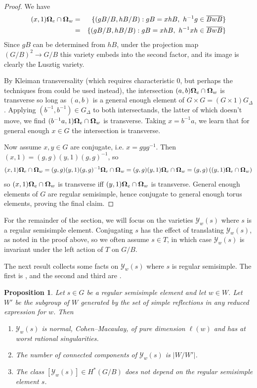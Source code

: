\documentclass[11pt]{amsart}
\newtheorem{proposition}[Thm]{Proposition}
\theoremstyle{definition}
\newcommand\bOm{{\bf \Omega}}
\newcommand\calY{{\mathcal Y}}
\begin{document}
\begin{proof}
  We have 
  \begin{eqnarray*}
    (x, 1) \bOm_e \cap \bOm_w
    &=& \{(gB/B, hB/B): gB = xhB,\ h^{-1}g \in \overline{BwB} \}  \\
    &=& \{(gB/B, hB/B): gB = xhB,\ h^{-1}xh \in \overline{BwB} \}  
  \end{eqnarray*}
  Since $gB$ can be determined from $hB$, under the projection map
  $(G/B)^2\to G/B$ this variety embeds into the second factor, and its
  image is clearly the Lusztig variety.

  By Kleiman transversality (which requires characteristic $0$,
  but perhaps the techniques from \cite{SchubertInduction} could be
  used instead), the
  intersection $(a,b)\bOm_e \cap \bOm_w$ is transverse so long as
  $(a,b)$ is a general enough element of $G\times G = (G\times 1)G_\Delta$.
  Applying $(b^{-1},b^{-1})\in G_\Delta$ to both intersectands, the latter
  of which doesn't move, we find $(b^{-1}a,1)\bOm_e \cap \bOm_w$ is transverse.
  Taking $x = b^{-1}a$, we learn that for general enough $x\in G$
  the intersection is transverse.

  Now assume $x,y \in G$ are conjugate, i.e. $x = g y g^{-1}$.
  Then $(x,1) = (g,g)(y,1)(g,g)^{-1}$, so
  \[ (x,1)\bOm_e \cap \bOm_w
  = (g,g)(y,1)(g,g)^{-1}\bOm_e \cap \bOm_w
  = (g,g)(y,1)\bOm_e \cap \bOm_w
  = (g,g)\left( (y,1)\bOm_e \cap \bOm_w\right)
  \]
  so $(x,1)\bOm_e \cap \bOm_w$ is transverse iff
  $(y,1)\bOm_e \cap \bOm_w$ is transverse. General enough elements of
  $G$ are regular semisimple, hence conjugate to general enough torus elements,
  proving the final claim.
\end{proof}

For the remainder of the section, we will focus on the varieties
$\calY_w(s)$ where $s$ is a regular semisimple element. 
Conjugating $s$ has the effect of translating $\calY_w(s)$, as noted
in the proof above, so we often assume $s \in T$, in which case $\calY_w(s)$ is invariant under the left action of $T$ on $G/B$.


The next result collects some facts on $\calY_w(s)$ where $s$ is regular semisimple. The first is \cite[Theorem 1.1]{BHL25-geomLusztig}, and the second and third are \cite[Theorem 4.6, Lemma 4.8]{K20-deligne-lusztig}.

\begin{proposition}\label{thm: Lusztig facts}
    Let $s \in G$ be a regular semisimple element and let $w \in W$. Let $W'$ be the subgroup of $W$ generated by the set of simple reflections in any reduced expression for $w$. Then

    \begin{enumerate}
    \item $\calY_w(s)$ is normal, Cohen--Macaulay, of pure dimension
      $\ell(w)$ and has at worst rational singularities.
    \item The number of connected components of $\calY_w(s)$ is $|W/W'|$.
    \item The class $[\calY_w(s)] \in H^*(G/B)$ does not depend on the
      regular semisimple element $s$.
    \end{enumerate}
\end{proposition}
\end{document}
